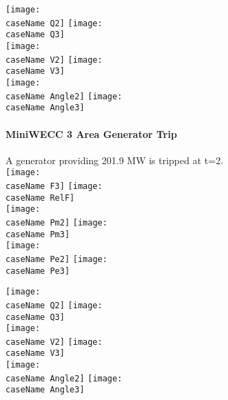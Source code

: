 \documentclass[12pt]{article}
\newcommand{\caseName}{ }
\begin{document}
	\texttt{[image: \\caseName Q2]} %
	\texttt{[image: \\caseName Q3]} \\

	\texttt{[image: \\caseName V2]} %
	\texttt{[image: \\caseName V3]} \\

	\texttt{[image: \\caseName Angle2]} %
	\texttt{[image: \\caseName Angle3]} 
	
\pagebreak
\renewcommand{\caseName}{miniWECCgenTrip027PSS}
\paragraph{MiniWECC 3 Area  Generator Trip} A generator providing 201.9 MW is tripped at t=2.\\

	\texttt{[image: \\caseName F3]} %
	\texttt{[image: \\caseName RelF]} \\

	\texttt{[image: \\caseName Pm2]} %
	\texttt{[image: \\caseName Pm3]} \\

	\texttt{[image: \\caseName Pe2]} %
	\texttt{[image: \\caseName Pe3]} 
	
\pagebreak

	\texttt{[image: \\caseName Q2]} %
	\texttt{[image: \\caseName Q3]} \\

	\texttt{[image: \\caseName V2]} %
	\texttt{[image: \\caseName V3]} \\

	\texttt{[image: \\caseName Angle2]} %
	\texttt{[image: \\caseName Angle3]} 
\end{document}
